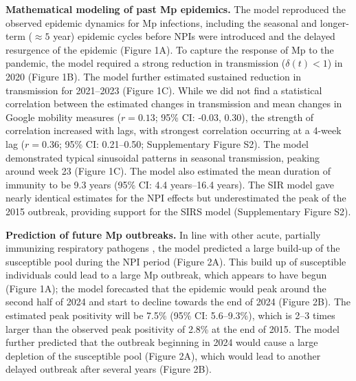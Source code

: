 \documentclass[12pt]{article}
\begin{document}
\textbf{Mathematical modeling of past Mp epidemics.}
The model reproduced the observed epidemic dynamics for Mp infections, including the seasonal and longer-term ($\approx 5$ year) epidemic cycles before NPIs were introduced and the delayed resurgence of the epidemic (Figure 1A).
To capture the response of Mp to the pandemic, the model required a strong reduction in transmission ($\delta(t) < 1$) in 2020 (Figure 1B).
The model further estimated sustained reduction in transmission for 2021--2023 (Figure 1C).
While we did not find a statistical correlation between the estimated changes in transmission and mean changes in Google mobility measures ($r=0.13$; 95\% CI: -0.03, 0.30),
the strength of correlation increased with lags, with strongest correlation occurring at a 4-week lag  ($r=0.36$; 95\% CI: 0.21--0.50; Supplementary Figure S2).
The model demonstrated typical sinusoidal patterns in seasonal transmission, peaking around week 23 (Figure 1C).
The model also estimated the mean duration of immunity to be 9.3 years (95\% CI: 4.4 years--16.4 years).
The SIR model gave nearly identical estimates for the NPI effects but underestimated the peak of the 2015 outbreak, providing support for the SIRS model (Supplementary Figure S2).

\textbf{Prediction of future Mp outbreaks.}
In line with other acute, partially immunizing respiratory pathogens \citep{baker2020impact}, the model predicted a large build-up of the susceptible pool during the NPI period (Figure 2A).
This build up of susceptible individuals could lead to a large Mp outbreak, which appears to have begun (Figure 1A);
the model forecasted that the epidemic would peak around the second half of 2024 and start to decline towards the end of 2024 (Figure 2B).
The estimated peak positivity will be 7.5\% (95\% CI: 5.6--9.3\%), which is 2--3 times larger than the observed peak positivity of 2.8\% at the end of 2015.
The model further predicted that the outbreak beginning in 2024 would cause a large depletion of the susceptible pool (Figure 2A), which would lead to another delayed outbreak after several years (Figure 2B).
\end{document}
